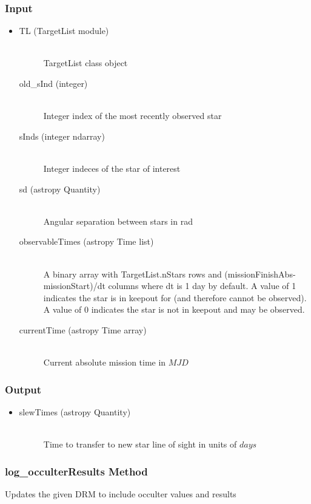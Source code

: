 \documentclass[cleanfoot]{asme2ej}
\begin{document}
\subsubsection*{Input}
\begin{itemize}
\item
\begin{description}
    \item[TL (TargetList module)] \hfill \\ TargetList class object
    \item[old\_sInd (integer)] \hfill \\ Integer index of the most recently observed star
    \item[sInds (integer ndarray)] \hfill \\ Integer indeces of the star of interest
    \item[sd (astropy Quantity)] \hfill \\ Angular separation between stars in rad
    \item[observableTimes (astropy Time list)] \hfill \\ A binary array with TargetList.nStars rows and (missionFinishAbs-missionStart)/dt columns where dt is 1 day by default. A value of 1 indicates the star is in keepout for (and therefore cannot be observed). A value of 0 indicates the star is not in keepout and may be observed.
    \item[currentTime (astropy Time array)] \hfill \\ Current absolute mission time in $MJD$
\end{description}
\end{itemize}
\subsubsection*{Output}
\begin{itemize}
\item
\begin{description}
    \item[slewTimes (astropy Quantity)] \hfill \\ Time to transfer to new star line of sight in units of $days$
\end{description}
\end{itemize}

\subsubsection{log\_occulterResults Method} 
Updates the given DRM to include occulter values and results
\end{document}

